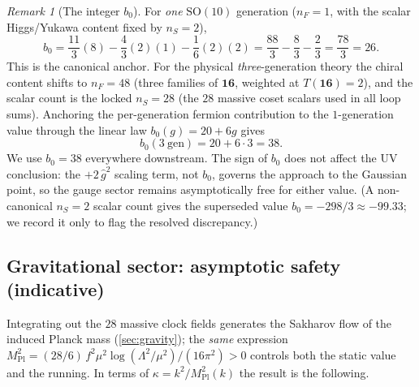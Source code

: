 \documentclass[11pt]{article}
\theoremstyle{plain}
\theoremstyle{definition}
\theoremstyle{remark}
\newtheorem{remark}[theorem]{Remark}
\begin{document}
\begin{remark}[The integer $b_{0}$]
\label{rem:frg:b0}
For \emph{one} $\mathrm{SO}(10)$ generation ($n_{F}=1$, with the scalar
Higgs/Yukawa content fixed by $n_{S}=2$),
\begin{equation}\label{eq:frg:b0one}
  b_{0}
  =\frac{11}{3}(8)-\frac43(2)(1)-\frac16(2)(2)
  =\frac{88}{3}-\frac{8}{3}-\frac{2}{3}
  =\frac{78}{3}=26 .
\end{equation}
This is the canonical anchor. For the physical \emph{three}-generation
theory the chiral content shifts to $n_{F}=48$ (three families of
$\mathbf{16}$, weighted at $T(\mathbf{16})=2$), and the scalar count is the
locked $n_{S}=28$ (the $28$ massive coset scalars used in all loop sums).
Anchoring the per-generation fermion contribution to the
$1$-generation value through the linear law $b_{0}(g)=20+6g$ gives
\begin{equation}\label{eq:frg:b0three}
  b_{0}(3\ \text{gen})=20+6\cdot3=38 .
\end{equation}
We use $b_{0}=38$ everywhere downstream. The sign of $b_{0}$ does not
affect the UV conclusion: the $+2\,\hat g^{2}$ scaling term, not $b_{0}$,
governs the approach to the Gaussian point, so the gauge sector remains
asymptotically free for either value. (A non-canonical $n_{S}=2$ scalar
count gives the superseded value $b_{0}=-298/3\approx-99.33$; we record it
only to flag the resolved discrepancy.)
\end{remark}

\subsection{Gravitational sector: asymptotic safety (indicative)}
\label{sec:frg:gravity}

Integrating out the $28$ massive clock fields generates the Sakharov flow
of the induced Planck mass (\autoref{sec:gravity}); the \emph{same}
expression $M_{\mathrm{Pl}}^{2}=(28/6)\,f^{2}\mu^{2}\log(\Lambda^{2}/\mu^{2})/(16\pi^{2})>0$
controls both the static value and the running. In terms of
$\kappa=k^{2}/M_{\mathrm{Pl}}^{2}(k)$ the result is the following.
\end{document}
